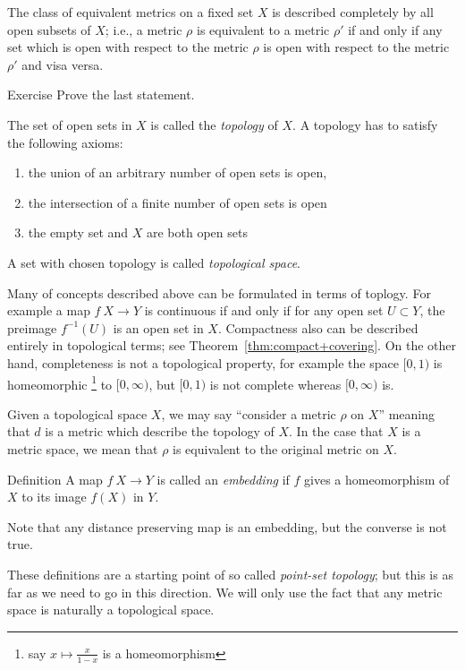 The class of equivalent metrics on a fixed set $X$
is described completely by all open subsets of $X$;
i.e., a metric $\rho$ is equivalent to a metric $\rho'$
if and only if any set which is open with respect to the metric $\rho$ is open with respect to the
metric $\rho'$ and visa versa.
\begin{thm}{Exercise}
Prove the last statement. 
\end{thm}

The set of open sets in $X$ is called the \emph{topology} of $X$.
A topology has to satisfy the following axioms:
\begin{enumerate}
\item the union of an arbitrary number of open sets is open,
\item the intersection of a finite number of open sets is open
\item the empty set and $X$ are both open sets
\end{enumerate}
A set with chosen topology is called \emph{topological space}.

Many of concepts described above can be formulated in terms of toplogy.
For example a map $f\: X\to Y$ is continuous if and only if for any open set $U\subset Y$,
the preimage $f^{-1}(U)$ is an open set in $X$.
Compactness also can be described entirely in topological terms;
see Theorem~\ref{thm:compact+covering}.
On the other hand, completeness is not a topological property,
for example the space $[0,1)$ is homeomorphic%
\footnote{say $x\mapsto \tfrac x{1-x}$ is a homeomorphism}
to $[0,\infty)$, but $[0,1)$ is not complete whereas $[0,\infty)$ is.

Given a topological space $X$, 
we may say ``consider a metric $\rho$ on $X$'' 
meaning that $d$ is a metric which describe the topology of $X$.
In the case that $X$ is a metric space,
we mean that $\rho$ is equivalent to the original metric on $X$. 

\begin{thm}{Definition}
A map $f\:X\to Y$ is called an \emph{embedding}
if $f$ gives a homeomorphism of $X$ to its image $f(X)$ in $Y$.
\end{thm}

Note that any distance preserving map is an embedding,
but the converse is not true. 

These definitions are a starting point of so called \emph{point-set topology};
but this is as far as we need to go in this direction.
We will only use the fact that any metric space is naturally a topological space.

